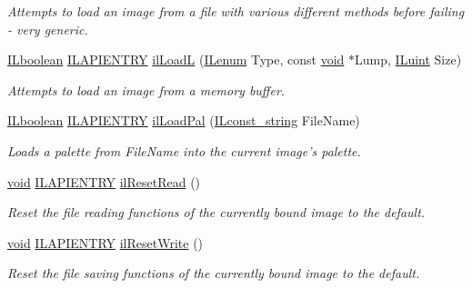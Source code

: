 \begin{DoxyCompactItemize}
\begin{DoxyCompactList}\small\item\em Attempts to load an image from a file with various different methods before failing -\/ very generic. \end{DoxyCompactList}\item 
\hyperlink{group__il__types_gaa6aa7c95cfdc06b4d8601ef832b7bb0a}{I\+Lboolean} \hyperlink{_i_l_8h_a69c08a8d06df986f7e46f209d131ef2f}{I\+L\+A\+P\+I\+E\+N\+T\+R\+Y} \hyperlink{group__file_ga0417a8c1202ae4720d98b0fe3ecddfda}{il\+Load\+L} (\hyperlink{group__il__types_ga62ca73445716183ef42b1f3906a45ed0}{I\+Lenum} Type, const \hyperlink{_i_l_8h_a5530e04d947bcddd83639ea7940faf10}{void} $\ast$Lump, \hyperlink{group__il__types_gaff8e86a1072c8d7cfe387fb87c6ed8e1}{I\+Luint} Size)
\begin{DoxyCompactList}\small\item\em Attempts to load an image from a memory buffer. \end{DoxyCompactList}\item 
\hyperlink{group__il__types_gaa6aa7c95cfdc06b4d8601ef832b7bb0a}{I\+Lboolean} \hyperlink{_i_l_8h_a69c08a8d06df986f7e46f209d131ef2f}{I\+L\+A\+P\+I\+E\+N\+T\+R\+Y} \hyperlink{group__file_gac412222fcdd3ae96b1d9de01c8e17a5a}{il\+Load\+Pal} (\hyperlink{group__il__types_ga1aa1edc3eb344e14acacb02bade24a5a}{I\+Lconst\+\_\+string} File\+Name)
\begin{DoxyCompactList}\small\item\em Loads a palette from File\+Name into the current image's palette. \end{DoxyCompactList}\item 
\hyperlink{_i_l_8h_a5530e04d947bcddd83639ea7940faf10}{void} \hyperlink{_i_l_8h_a69c08a8d06df986f7e46f209d131ef2f}{I\+L\+A\+P\+I\+E\+N\+T\+R\+Y} \hyperlink{group__file_gaad6da45dcc526f0b4d05c488c504b77b}{il\+Reset\+Read} ()
\begin{DoxyCompactList}\small\item\em Reset the file reading functions of the currently bound image to the default. \end{DoxyCompactList}\item 
\hyperlink{_i_l_8h_a5530e04d947bcddd83639ea7940faf10}{void} \hyperlink{_i_l_8h_a69c08a8d06df986f7e46f209d131ef2f}{I\+L\+A\+P\+I\+E\+N\+T\+R\+Y} \hyperlink{group__file_gac1f4f4a66b6ff3ae5a986b24cf2cd626}{il\+Reset\+Write} ()
\begin{DoxyCompactList}\small\item\em Reset the file saving functions of the currently bound image to the default. \end{DoxyCompactList}\item 

\end{DoxyCompactItemize}
